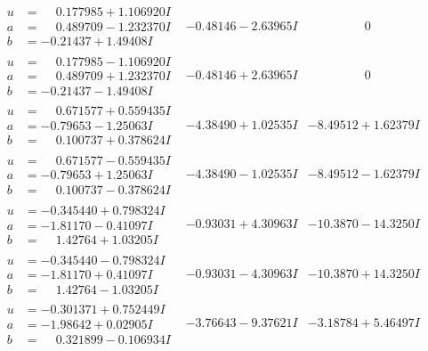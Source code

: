\documentclass[1p]{elsarticle_modified}
\theoremstyle{definition}
\begin{document}
$$\begin{array}{c|c|c}
\begin{aligned}
u &= \phantom{-}0.177985 + 1.106920 I \\
a &= \phantom{-}0.489709 - 1.232370 I \\
b &= -0.21437 + 1.49408 I\end{aligned}
 & -0.48146 - 2.63965 I & \phantom{-0.000000 } 0 \\ \hline\begin{aligned}
u &= \phantom{-}0.177985 - 1.106920 I \\
a &= \phantom{-}0.489709 + 1.232370 I \\
b &= -0.21437 - 1.49408 I\end{aligned}
 & -0.48146 + 2.63965 I & \phantom{-0.000000 } 0 \\ \hline\begin{aligned}
u &= \phantom{-}0.671577 + 0.559435 I \\
a &= -0.79653 - 1.25063 I \\
b &= \phantom{-}0.100737 + 0.378624 I\end{aligned}
 & -4.38490 + 1.02535 I & -8.49512 + 1.62379 I \\ \hline\begin{aligned}
u &= \phantom{-}0.671577 - 0.559435 I \\
a &= -0.79653 + 1.25063 I \\
b &= \phantom{-}0.100737 - 0.378624 I\end{aligned}
 & -4.38490 - 1.02535 I & -8.49512 - 1.62379 I \\ \hline\begin{aligned}
u &= -0.345440 + 0.798324 I \\
a &= -1.81170 - 0.41097 I \\
b &= \phantom{-}1.42764 + 1.03205 I\end{aligned}
 & -0.93031 + 4.30963 I & -10.3870 - 14.3250 I \\ \hline\begin{aligned}
u &= -0.345440 - 0.798324 I \\
a &= -1.81170 + 0.41097 I \\
b &= \phantom{-}1.42764 - 1.03205 I\end{aligned}
 & -0.93031 - 4.30963 I & -10.3870 + 14.3250 I \\ \hline\begin{aligned}
u &= -0.301371 + 0.752449 I \\
a &= -1.98642 + 0.02905 I \\
b &= \phantom{-}0.321899 - 0.106934 I\end{aligned}
 & -3.76643 - 9.37621 I & -3.18784 + 5.46497 I \\ \hline\begin{aligned}

\end{aligned}
\end{array}$$
\end{document}
